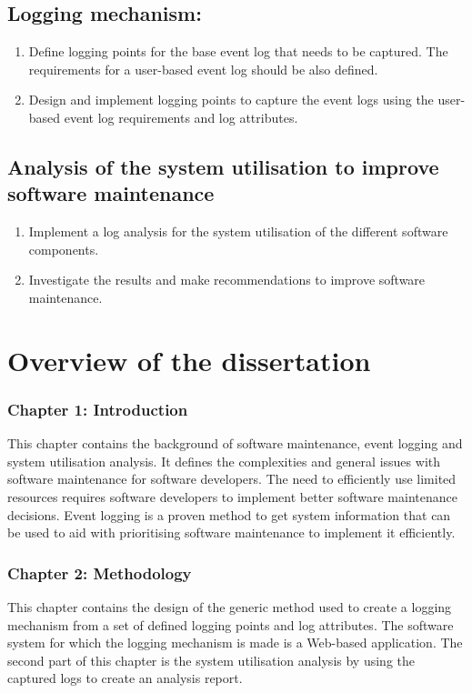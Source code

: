 \subsection{Logging mechanism:}
\begin{enumerate}
	\item Define logging points for the base event log that needs to be captured. The requirements for a user-based event log should be also defined.
	\item Design and implement logging points to capture the event logs using the user-based event log requirements and log attributes.
\end{enumerate}

\subsection{Analysis of the system utilisation to improve software maintenance}
\begin{enumerate}
	\item Implement a log analysis for the system utilisation of the different software components.
	\item Investigate the results and make recommendations to improve software maintenance.
\end{enumerate}

\section{Overview of the dissertation}
\subsubsection{Chapter 1: Introduction}
This chapter contains the background of software maintenance, event logging and system utilisation analysis. It defines the complexities and general issues with software maintenance for software developers. The need to efficiently use limited resources requires software developers to implement better software maintenance decisions. Event logging is a proven method to get system information that can be used to aid with prioritising software maintenance to implement it efficiently.

\subsubsection{Chapter 2: Methodology}
This chapter contains the design of the generic method used to create a logging mechanism from a set of defined logging points and log attributes. The software system for which the logging mechanism is made is a Web-based application. The second part of this chapter is the system utilisation analysis by using the captured logs to create an analysis report.

